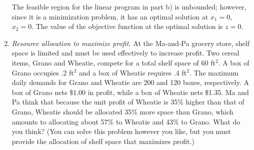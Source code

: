 \begin{enumerate}
\begin{solution}
\begin{center}
\end{center}

The feasible region for the linear program in part b) is unbounded;
however, since it is a minimization problem, it has an optimal
solution at $x_1=0$, $x_2=0$. The value of the objective function at
the optimal solution is $z=0$.

\begin{center}
\end{center}

\end{solution}

\item \emph{Resource allocation to maximize profit.} 
At the Ma-and-Pa grocery store, shelf space is limited
  and must be used effectively to increase profit. Two cereal items,
  Grano and Wheatie, compete for a total shelf space of 60 ft$^2$. A
  box of Grano occupies .2 ft$^2$ and a box of Wheatie requires .4
  ft$^2$. The maximum daily demands for Grano and Wheatie are 200 and 120
  boxes, respectively. A box of Grano nets \$1.00 in profit, while a
  box of Wheatie nets \$1.35. Ma and Pa think that because the unit
  profit of Wheatie is 35\% higher than that of Grano, Wheatie should
  be allocated 35\% more space than Grano, which amounts to allocating
  about 57\% to Wheatie and 43\% to Grano. What do you think?
  (You can solve this problem however you like, but you must provide
  the allocation of shelf space that maximizes profit.)
  


\end{enumerate}
